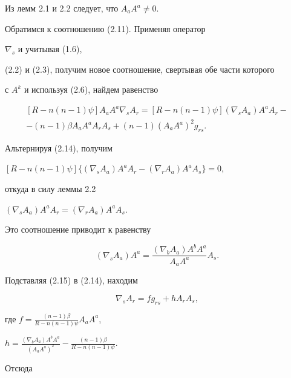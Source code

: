  


Из лемм 2.1 и 2.2 следует, что $A_a A^a\ne 0$. 


 


Обратимся к соотношению (2.11). Применяя оператор 


$\nabla_s$ и учитывая (1.6), 


(2.2) и (2.3), получим новое соотношение, свертывая обе части которого 


с $A^k$ и используя (2.6), найдем равенство 


\begin{multline} 


[R-n(n-1)\psi]A_a A^a\nabla_s A_r= 


[R-n(n-1)\psi](\nabla_s A_a)A^a A_r- \\


-(n-1)\beta A_a A^a A_r A_s+(n-1)(A_a A^a)^2g_{rs}. 


\end{multline} 


Альтернируя (2.14), получим 


$[R-n(n-1)\psi]\{(\nabla_s A_a)A^a A_r- 


(\nabla_r A_a)A^a A_s\}=0$, 


откуда в силу леммы 2.2\; 


$(\nabla_s A_a)A^a A_r=(\nabla_r A_a)A^a A_s$. 


Это соотношение приводит к равенству 


\begin{equation} 


(\nabla_s A_a)A^a= 


\frac{(\nabla_b A_a)A^b A^a} 


{A_a A^a}A_s. 


\end{equation} 


Подставляя (2.15) в (2.14), находим 


\begin{equation} 


\nabla_s A_r=f g_{rs}+h A_r A_s, 


\end{equation} 


где $f=\frac{(n-1)\beta}{R-n(n-1)\psi}A_a A^a$, 


$h=\frac{(\nabla_b A_a)A^b A^a}{(A_a A^a)^2}- 


\frac{(n-1)\beta}{R-n(n-1)\psi}$. 


Отсюда 


$$ 


